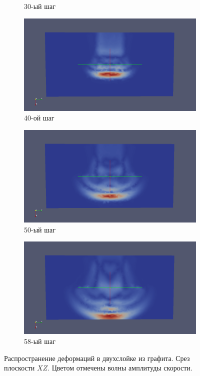 \begin{figure}[H]
\begin{subfigure}[b]{0.5\textwidth}
\caption{30-ый шаг}
\end{subfigure}
\begin{subfigure}[b]{0.5\textwidth}
\centering
\includegraphics[width=1.0\textwidth]{png/two-graphite-layers/xz40.png}
\caption{40-ой шаг}
\end{subfigure}
\begin{subfigure}[b]{0.5\textwidth}
\centering
\includegraphics[width=1.0\textwidth]{png/two-graphite-layers/xz50.png}
\caption{50-ый шаг}
\end{subfigure}
\begin{subfigure}[b]{0.5\textwidth}
\centering
\includegraphics[width=1.0\textwidth]{png/two-graphite-layers/xz58.png}
\caption{58-ый шаг}
\end{subfigure}
\caption{Распространение деформаций в двухслойке из графита. Срез плоскости $XZ$. Цветом отмечены волны амплитуды скорости.}
\label{pic:two_graphite_xz}
\end{figure}
	
